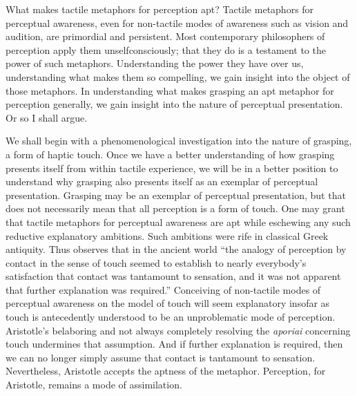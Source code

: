 \documentclass[12pt]{article}
\begin{document}
What makes tactile metaphors for perception apt? Tactile metaphors for perceptual awareness, even for non-tactile modes of awareness such as vision and audition, are primordial and persistent. Most contemporary philosophers of perception apply them unselfconsciously; that they do is a testament to the power of such metaphors. Understanding the power they have over us, understanding what makes them so compelling, we gain insight into the object of those metaphors. In understanding what makes grasping an apt metaphor for perception generally, we gain insight into the nature of perceptual presentation. Or so I shall argue.

We shall begin with a phenomenological investigation into the nature of grasping, a form of haptic touch. Once we have a better understanding of how grasping presents itself from within tactile experience, we will be in a better position to understand why grasping also presents itself as an exemplar of perceptual presentation. Grasping may be an exemplar of perceptual presentation, but that does not necessarily mean that all perception is a form of touch. One may grant that tactile metaphors for perceptual awareness are apt while eschewing any such reductive explanatory ambitions. Such ambitions were rife in classical Greek antiquity. Thus \citet[39]{Lindberg:1977aa} observes that in the ancient world ``the analogy of perception by contact in the sense of touch seemed to establish to nearly everybody’s satisfaction that contact was tantamount to sensation, and it was not apparent that further explanation was required.'' Conceiving of non-tactile modes of perceptual awareness on the model of touch will seem explanatory insofar as touch is antecedently understood to be an unproblematic mode of perception. Aristotle's belaboring and not always completely resolving the \emph{aporiai} concerning touch undermines that assumption. And if further explanation is required, then we can no longer simply assume that contact is tantamount to sensation. Nevertheless, Aristotle accepts the aptness of the metaphor. Perception, for Aristotle, remains a mode of assimilation.
\end{document}
